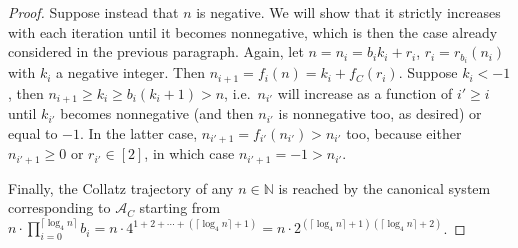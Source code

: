 \documentclass[10pt,a4paper]{amsart}
\newcommand{\N}{\mathbb{N}}
\begin{document}
\begin{proof}
Suppose instead that $n$ is negative. We will show that it strictly increases with each iteration until it becomes nonnegative, which is then the case already considered in the previous paragraph. Again, let $n = n_i = b_ik_i+r_i$, $r_i = r_{b_i}(n_i)$ with $k_i$ a negative integer. Then $n_{i+1} = f_i(n) = k_i + f_C(r_i)$. Suppose $k_i<-1$, then $n_{i+1}\geqslant k_i \geqslant b_i(k_i+1) > n$, i.e.\ $n_{i'}$ will increase as a function of $i'\geqslant i$ until $k_{i'}$ becomes nonnegative (and then $n_{i'}$ is nonnegative too, as desired) or equal to $-1$. In the latter case, $n_{i'+1} = f_{i'}(n_{i'})>n_{i'}$ too, because either $n_{i'+1}\geqslant0$ or $r_{i'}\in[2]$, in which case $n_{i'+1}=-1>n_{i'}$.

Finally, the Collatz trajectory of any $n\in\N$ is reached by the canonical system corresponding to $\mathcal{A}_C$ starting from $n\cdot\prod_{i=0}^{\lceil\log_4n\rceil}b_i = n\cdot4^{1+2+\dotsb+(\lceil\log_4n\rceil+1)} = n\cdot2^{(\lceil\log_4n\rceil+1)(\lceil\log_4n\rceil+2)}$.
\end{proof}
\end{document}
